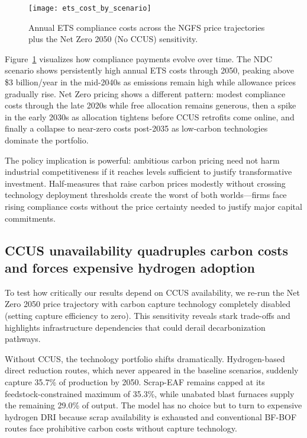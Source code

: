 \begin{figure}[!t]
  \centering
  \texttt{[image: ets\_cost\_by\_scenario]}
  \caption{Annual ETS compliance costs across the NGFS price trajectories plus the Net Zero 2050 (No CCUS) sensitivity.}
  \label{fig:ets-costs}
\end{figure}

Figure~\ref{fig:ets-costs} visualizes how compliance payments evolve over time. The NDC scenario shows persistently high annual ETS costs through 2050, peaking above \$3 billion/year in the mid-2040s as emissions remain high while allowance prices gradually rise. Net Zero pricing shows a different pattern: modest compliance costs through the late 2020s while free allocation remains generous, then a spike in the early 2030s as allocation tightens before CCUS retrofits come online, and finally a collapse to near-zero costs post-2035 as low-carbon technologies dominate the portfolio.

The policy implication is powerful: ambitious carbon pricing need not harm industrial competitiveness if it reaches levels sufficient to justify transformative investment. Half-measures that raise carbon prices modestly without crossing technology deployment thresholds create the worst of both worlds—firms face rising compliance costs without the price certainty needed to justify major capital commitments.

\subsection{CCUS unavailability quadruples carbon costs and forces expensive hydrogen adoption}

To test how critically our results depend on CCUS availability, we re-run the Net Zero 2050 price trajectory with carbon capture technology completely disabled (setting capture efficiency to zero). This sensitivity reveals stark trade-offs and highlights infrastructure dependencies that could derail decarbonization pathways.

Without CCUS, the technology portfolio shifts dramatically. Hydrogen-based direct reduction routes, which never appeared in the baseline scenarios, suddenly capture 35.7\% of production by 2050. Scrap-EAF remains capped at its feedstock-constrained maximum of 35.3\%, while unabated blast furnaces supply the remaining 29.0\% of output. The model has no choice but to turn to expensive hydrogen DRI because scrap availability is exhausted and conventional BF-BOF routes face prohibitive carbon costs without capture technology.

